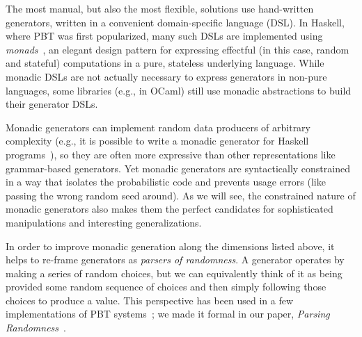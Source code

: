 \iflater{}\fi
The most manual, but also the most flexible, solutions use hand-written
generators, written in a convenient domain-specific language (DSL).
In  Haskell, where PBT was
first popularized, many such DSLs are implemented using {\em
monads\/}~\cite{moggi1991notions}, an elegant design pattern for
expressing effectful (in this case, random and stateful) computations
in a pure, stateless underlying
language. While monadic DSLs are not actually necessary to express generators in
non-pure languages, some libraries (e.g., in OCaml) still use monadic
abstractions to build their generator DSLs.

Monadic generators can implement random data producers of arbitrary complexity
(e.g., it is possible to write a monadic generator for Haskell
programs~\cite{palka_testing_2011}), so they are often more expressive than
other representations like grammar-based generators.  Yet monadic generators are
syntactically constrained in a way that isolates the probabilistic code and
prevents usage errors (like passing the wrong random seed around). As we will
see, the constrained nature of monadic generators also makes them the perfect
candidates for sophisticated manipulations and interesting generalizations.

In order to improve monadic generation along the dimensions listed
above, it helps to re-frame generators as {\em parsers of randomness}. A generator
operates by making a series of random choices, but we can equivalently think of
it as being provided some random sequence of choices and then simply following
those choices to produce a value. This perspective has been used in a few
implementations of PBT
systems~\cite{maciver2019hypothesis, dolan2017testing}; we made it
formal in our paper, {\em Parsing Randomness}~\cite{goldstein2022parsing}.


